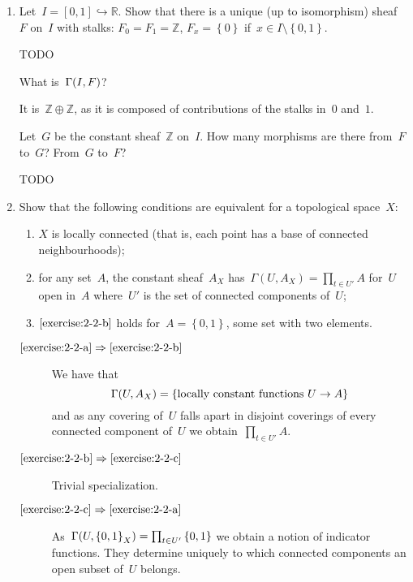 \documentclass[a4paper,11pt,oneside,openany,article]{memoir}
\begin{document}
\begin{enumerate}
  \item Let~$I=[0,1]\hookrightarrow\mathbb{R}$. Show that there is a unique (up to isomorphism) sheaf~$F$ on~$I$ with stalks: $F_0=F_1=\mathbb{Z}$, $F_x=\left\{ 0 \right\}$ if~$x\in I\setminus\left\{ 0,1 \right\}$.

    \begin{solution}
      TODO
    \end{solution}

    What is~$\mathrm{\Gamma}(I, F)$?

    \begin{solution}
      It is~$\mathbb{Z}\oplus\mathbb{Z}$, as it is composed of contributions of the stalks in~$0$ and~$1$.
    \end{solution}

    Let~$G$ be the constant sheaf~$\mathbb{Z}$ on~$I$. How many morphisms are there from~$F$ to~$G$? From~$G$ to~$F$?

    \begin{solution}
      TODO
    \end{solution}

  \item Show that the following conditions are equivalent for a topological space~$X$:
    \begin{enumerate}
      \item\label{exercise:2-2-a} $X$ is locally connected (that is, each point has a base of connected neighbourhoods);
      \item\label{exercise:2-2-b} for any set~$A$, the constant sheaf~$A_X$ has~$\Gamma(U,A_X)=\prod_{t\in U'}A$ for~$U$ open in~$A$ where~$U'$ is the set of connected components of~$U$;
      \item\label{exercise:2-2-c} $\ref{exercise:2-2-b}$ holds for~$A=\left\{ 0,1 \right\}$, some set with two elements.
    \end{enumerate}

    \begin{solution}
      \begin{description}
        \item[$\ref{exercise:2-2-a}\Rightarrow\ref{exercise:2-2-b}$] We have that
          \begin{equation}
            \mathrm{\Gamma}(U,A_X)=\left\{ \text{locally constant functions~$U\to A$} \right\}
          \end{equation}
          and as any covering of~$U$ falls apart in disjoint coverings of every connected component of~$U$ we obtain~$\prod_{t\in U'}A$.
        \item[$\ref{exercise:2-2-b}\Rightarrow\ref{exercise:2-2-c}$] Trivial specialization.
        \item[$\ref{exercise:2-2-c}\Rightarrow\ref{exercise:2-2-a}$] As~$\mathrm{\Gamma}(U,\left\{ 0,1 \right\}_X)=\prod_{t\in U'}\left\{ 0,1 \right\}$ we obtain a notion of indicator functions. They determine uniquely to which connected components an open subset of~$U$ belongs.
      \end{description}
    \end{solution}


\end{enumerate}
\end{document}
